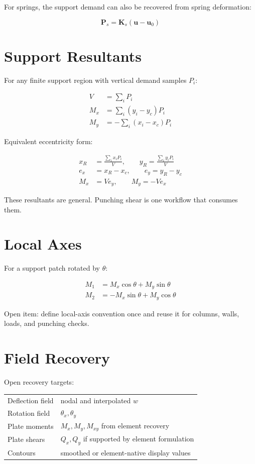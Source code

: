 \documentclass[10pt]{article}
\begin{document}
For springs, the support demand can also be recovered from spring deformation:

\begin{equation}
\mathbf P_s = \mathbf K_s(\mathbf u-\mathbf u_0)
\end{equation}

\section{Support Resultants}

For any finite support region with vertical demand samples $P_i$:

\begin{align}
V &= \sum_i P_i \\
M_x &= \sum_i (y_i-y_c)P_i \\
M_y &= -\sum_i (x_i-x_c)P_i
\end{align}

Equivalent eccentricity form:

\begin{align}
x_R &= \frac{\sum_i x_iP_i}{V}, \qquad
y_R = \frac{\sum_i y_iP_i}{V} \\
e_x &= x_R-x_c,\qquad e_y=y_R-y_c \\
M_x &= V e_y,\qquad M_y=-V e_x
\end{align}

These resultants are general. Punching shear is one workflow that consumes them.

\section{Local Axes}

For a support patch rotated by $\theta$:

\begin{align}
M_1 &= M_x\cos\theta + M_y\sin\theta \\
M_2 &= -M_x\sin\theta + M_y\cos\theta
\end{align}

Open item: define local-axis convention once and reuse it for columns, walls,
loads, and punching checks.

\section{Field Recovery}

Open recovery targets:

{\ttfamily\footnotesize
\begin{tabular}{@{}p{1.8in}p{4.7in}@{}}
Deflection field & nodal and interpolated $w$ \\
Rotation field & $\theta_x,\theta_y$ \\
Plate moments & $M_x,M_y,M_{xy}$ from element recovery \\
Plate shears & $Q_x,Q_y$ if supported by element formulation \\
Contours & smoothed or element-native display values \\
\end{tabular}
}
\end{document}
